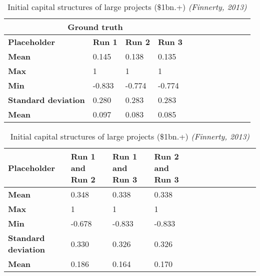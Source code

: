 \begin{table}[h]
    \centering
    \begin{tabular}{@{}llllllllllll@{}}\toprule
        \multicolumn{4}{c}{\textbf{Ground truth}} \\
        \toprule
        \textbf{Placeholder}  & \textbf{Run 1} & \textbf{Run 2} & \textbf{Run 3}\\ 
        \midrule
        \textbf{Mean} & 0.145  & 0.138 & 0.135 \\
        \hdashline
        \textbf{Max} & 1 & 1 & 1 \\
        \hdashline
        \textbf{Min} & -0.833 & -0.774 & -0.774 \\
        \hdashline
        \textbf{Standard deviation} & 0.280 & 0.283 & 0.283 \\
        \hdashline
        \textbf{Mean} & 0.097 & 0.083 & 0.085 \\
        \bottomrule
    \end{tabular}
    \caption{Initial capital structures of large projects (\$1bn.+) \emph{(Finnerty, 2013)}}
\end{table}

\begin{table}[h]
    \centering
    \begin{tabular}{@{}llllllllllll@{}}\toprule
        \textbf{Placeholder}  & \textbf{Run 1 and Run 2} & \textbf{Run 1 and Run 3} & \textbf{Run 2 and Run 3}\\ 
        \midrule
        \textbf{Mean} & 0.348  & 0.338 & 0.338 \\
        \hdashline
        \textbf{Max} & 1 & 1 & 1 \\
        \hdashline
        \textbf{Min} & -0.678 & -0.833 & -0.833 \\
        \hdashline
        \textbf{Standard deviation} & 0.330 & 0.326 & 0.326 \\
        \hdashline
        \textbf{Mean} & 0.186 & 0.164 & 0.170 \\
        \bottomrule
    \end{tabular}
    \caption{Initial capital structures of large projects (\$1bn.+) \emph{(Finnerty, 2013)}}
\end{table}

